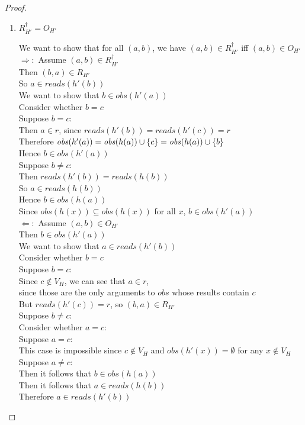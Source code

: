 \begin{proof}
\begin{enumerate}
\item $R^\dagger_{H'} = O_{H'}$ 
  \begin{tabbedproof}
    \oo We want to show that for all $(a,b)$, we have $(a,b) \in R^\dagger_{H'}$ iff $(a,b) \in O_{H'}$ \\
    \oo $\Rightarrow:$ Assume $(a,b) \in R^\dagger_{H'}$ \\
    \ooo Then $(b, a) \in R_{H'}$ \\
    \ooo So $a \in \mathit{reads}(h'(b))$ \\
    \ooo We want to show that $b \in \mathit{obs}(h'(a))$ \\
    \ooo Consider whether $b = c$ \\
    \ooo Suppose $b = c$: \\
    \oooo Then $a \in r$, since $\mathit{reads}(h'(b)) = \mathit{reads}(h'(c)) = r$ \\
    \oooo Therefore $\mathit{obs}(h'(a)) = \mathit{obs}(h(a)) \cup \{{c}\} = \mathit{obs}(h(a)) \cup \{{b}\}$ \\
    \oooo Hence $b \in \mathit{obs}(h'(a))$ \\
    \ooo Suppose $b \not= c$: \\
    \oooo Then $\mathit{reads}(h'(b)) = \mathit{reads}(h(b))$ \\
    \oooo So $a \in \mathit{reads}(h(b))$ \\
    \oooo Hence $b \in \mathit{obs}(h(a))$ \\
    \oooo Since $\mathit{obs}(h(x)) \subseteq \mathit{obs}(h(x))$ for all $x$, $b \in \mathit{obs}(h'(a))$ \\
    \oo $\Leftarrow:$ Assume $(a,b) \in O_{H'}$ \\
    \ooo Then $b \in \mathit{obs}(h'(a))$ \\
    \ooo We want to show that $a \in \mathit{reads}(h'(b))$ \\
    \ooo Consider whether $b = c$ \\
    \ooo Suppose $b = c$: \\
    \oooo Since $c \not\in V_H$, we can see that $a \in r$, \\
    \ooox since those are the only arguments to $\mathit{obs}$ whose results contain $c$ \\ 
    \oooo But $\mathit{reads}(h'(c)) = r$, so $(b, a) \in R_{H'}$ \\
    \ooo Suppose $b \not= c$: \\
    \oooo Consider whether $a = c$: \\
    \oooo Suppose $a = c$: \\
    \ooooo This case is impossible since $c \not\in V_H$ and $\mathit{obs}(h'(x)) = \emptyset$ for any $x \not\in V_H$ \\
    \oooo Suppose $a \not= c$: \\
    \ooooo Then it follows that $b \in \mathit{obs}(h(a))$ \\
    \ooooo Then it follows that $a \in \mathit{reads}(h(b))$ \\
    \ooooo Therefore $a \in \mathit{reads}(h'(b))$ 
  \end{tabbedproof}


\end{enumerate}
\end{proof}
